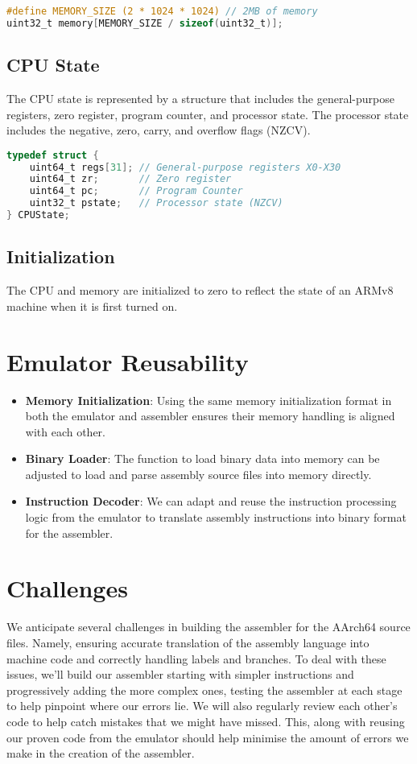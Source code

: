 \documentclass[a4paper, 10pt]{article}
\begin{document}
\begin{lstlisting}[language=C, caption=Memory Initialization]
#define MEMORY_SIZE (2 * 1024 * 1024) // 2MB of memory
uint32_t memory[MEMORY_SIZE / sizeof(uint32_t)];
\end{lstlisting}

\subsection{CPU State}
The CPU state is represented by a structure that includes the general-purpose registers, zero register, program counter, and processor state. The processor state includes the negative, zero, carry, and overflow flags (NZCV).

\begin{lstlisting}[language=C, caption=CPUState Structure]
typedef struct {
    uint64_t regs[31]; // General-purpose registers X0-X30
    uint64_t zr;       // Zero register
    uint64_t pc;       // Program Counter
    uint32_t pstate;   // Processor state (NZCV)
} CPUState;
\end{lstlisting}

\subsection{Initialization}
The CPU and memory are initialized to zero to reflect the state of an ARMv8 machine when it is first turned on.

\section{Emulator Reusability}
\begin{itemize}
    \item \textbf{Memory Initialization}: Using the same memory initialization format in both the emulator and assembler ensures their memory handling is aligned with each other.
    \item \textbf{Binary Loader}: The function to load binary data into memory can be adjusted to load and parse assembly source files into memory directly.
    \item \textbf{Instruction Decoder}: We can adapt and reuse the instruction processing logic from the emulator to translate assembly instructions into binary format for the assembler.
\end{itemize}


\section{Challenges}
We anticipate several challenges in building the assembler for the AArch64 source files. Namely, ensuring accurate translation of the assembly language into machine code and correctly handling labels and branches. To deal with these issues, we'll build our assembler starting with simpler instructions and progressively adding the more complex ones, testing the assembler at each stage to help pinpoint where our errors lie. We will also regularly review each other's code to help catch mistakes that we might have missed. This, along with reusing our proven code from the emulator should help minimise the amount of errors we make in the creation of the assembler.
\end{document}
